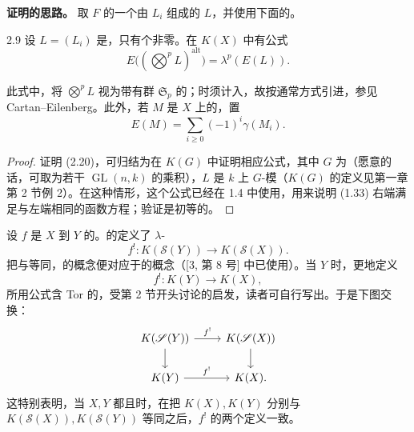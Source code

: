 \textbf{证明的思路。} 取 $F$ 的一个由 $L_i$ 组成的 $L$，并使用下面的。
\begin{SGAresult}{}{2.9}
设 $L=(L_i)$ 是，只有个非零。在 $K(X)$ 中有公式
\[
E\bigl((\mathop{\bigotimes}\nolimits^p L)^{\mathrm{alt}}\bigr)=\lambda^p(E(L)).\tag{2.20}
\]
\end{SGAresult}
此式中，将 $\bigotimes^p L$ 视为带有群 $\mathfrak S_p$ 的；时须计入，故按通常方式引进，参见 Cartan--Eilenberg。此外，若 $M$ 是 $X$ 上的，置
\[
E(M)=\sum_{i\geq0}(-1)^i\gamma(M_i).
\]
\begin{proof}
证明 (2.20)，可归结为在 $K(G)$ 中证明相应公式，其中 $G$ 为（愿意的话，可取为若干 $\operatorname{GL}(n,k)$ 的乘积），$L$ 是 $k$ 上 $G$-模（$K(G)$ 的定义见第一章第 2 节例 2）。在这种情形，这个公式已经在 1.4 中使用，用来说明 (1.33) 右端满足与左端相同的函数方程；验证是初等的。
\end{proof}

设 $f$ 是 $X$ 到 $Y$ 的。的定义了 $\lambda$-
\[
f^!:K(\mathscr S(Y))\longrightarrow K(\mathscr S(X)).
\]
把与等同，的概念便对应于的概念（[3, 第 8 号] 中已使用）。当 $Y$ 时，更地定义
\[
f^!:K(Y)\longrightarrow K(X),\tag{2.21}
\]
所用公式含 Tor 的，受第 2 节开头讨论的启发，读者可自行写出。于是下图交换：
\[
\begin{tikzcd}
K(\mathscr S(Y))\arrow[r,"f^!"]\arrow[d]&K(\mathscr S(X))\arrow[d]\\
K(Y)\arrow[r,"f^!"]&K(X).
\end{tikzcd}
\]
这特别表明，当 $X,Y$ 都且时，在把 $K(X),K(Y)$ 分别与 $K(\mathscr S(X)),K(\mathscr S(Y))$ 等同之后，$f^!$ 的两个定义一致。

